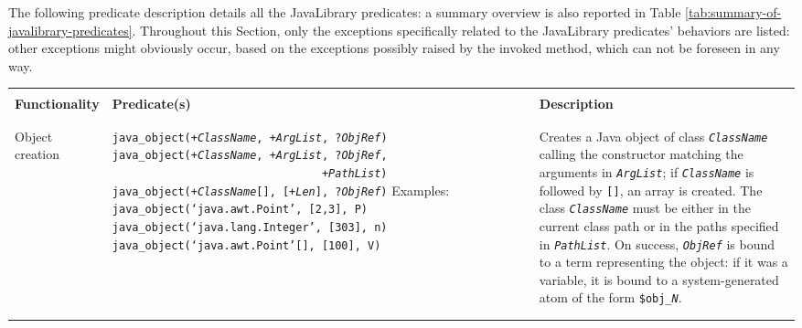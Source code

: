 The following predicate description details all the JavaLibrary predicates: a summary overview is also reported in Table \ref{tab:summary-of-javalibrary-predicates}.
%
Throughout this Section, only the exceptions specifically related to the JavaLibrary predicates' behaviors are listed: other exceptions might obviously occur, based on the exceptions possibly raised by the invoked method, which can not be foreseen in any way.

\begin{table}
    \begin{center}{\scriptsize
    \begin{tabular}{p{2.3cm}p{6.6cm}p{4.6cm}}\hline\hline
    \\
    {\small \textbf{Functionality}} &
    {\small \textbf{Predicate(s)}} &
    {\small \textbf{Description}}
    \\\\\hline\\
    Object creation
    &
    \texttt{java\_object(+\textit{ClassName}, +\textit{ArgList}, ?\textit{ObjRef})}\newline
    \texttt{java\_object(+\textit{ClassName}, +\textit{ArgList}, ?\textit{ObjRef},
    \mbox{~~~~~~~~~~~~~~~~~~~~~~~~~~~~~~~~}+\textit{PathList})}\newline
    \texttt{java\_object(+\textit{ClassName}[], [+\textit{Len}], ?\textit{ObjRef})}
    \newline
    \newline
    Examples:\newline
    \texttt{java\_object(`java.awt.Point', [2,3], P)}\newline
    \texttt{java\_object(`java.lang.Integer', [303], n)}\newline
    \texttt{java\_object(`java.awt.Point'[], [100], V)}
    &
    Creates a Java object of class \textit{\texttt{ClassName}} calling the
    constructor matching the arguments in \textit{\texttt{ArgList}}; if
    \textit{\texttt{ClassName}} is followed by \texttt{[]}, an array is created.
    The class \textit{\texttt{ClassName}} must be either in the current class path or
    in the paths specified in \texttt{\textit{PathList}}.
    On success, \textit{\texttt{ObjRef}} is bound to a term representing the
    object: if it was a variable, it is bound to a system-generated atom
    of the form \texttt{\$obj\_\textit{N}}.
    \\\\\hline\\

\end{tabular}}
\end{center}
\end{table}
